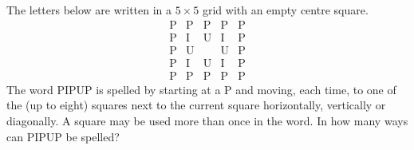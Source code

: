 The letters below are written in a $5\times5$ grid with an empty centre square.
\[\begin{array}{ccccc}
\mathrm{P}&\mathrm{P}&\mathrm{P}&\mathrm{P}&\mathrm{P}\\
\mathrm{P}&\mathrm{I}&\mathrm{U}&\mathrm{I}&\mathrm{P}\\
\mathrm{P}&\mathrm{U}&&\mathrm{U}&\mathrm{P}\\
\mathrm{P}&\mathrm{I}&\mathrm{U}&\mathrm{I}&\mathrm{P}\\
\mathrm{P}&\mathrm{P}&\mathrm{P}&\mathrm{P}&\mathrm{P}
\end{array}\]
The word PIPUP is spelled by starting at a P and moving, each time, to one of the (up to eight) squares next to the current square horizontally, vertically or diagonally. A square may be used more than once in the word. In how many ways can PIPUP be spelled?
